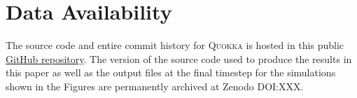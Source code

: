 \documentclass[fleqn,usenatbib]{mnras}
\begin{document}
\section*{Data Availability}
The source code and entire commit history for \textsc{Quokka} is hosted in this public \faGithub\href{https://github.com/BenWibking/quokka-code}{GitHub repository}. The version of the source code used to produce the results in this paper as well as the output files at the final timestep for the simulations shown in the Figures are permanently archived at Zenodo DOI:XXX.







\appendix



\bsp	%
\label{lastpage}
\end{document}
